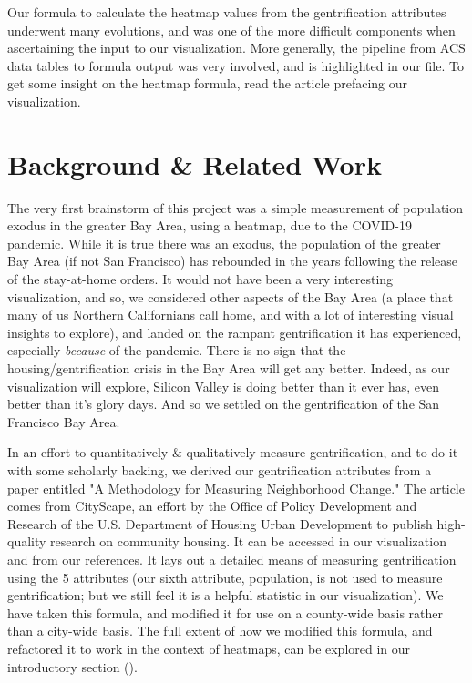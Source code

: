 \documentclass{article}
\begin{document}
    Our formula to calculate the heatmap values from the gentrification attributes underwent many evolutions, and was one of the more difficult components when ascertaining the input to our visualization. More generally, the pipeline from ACS data tables to formula output was very involved, and is highlighted in our  file. To get some insight on the heatmap formula, read the article prefacing our visualization. 

\section{Background \& Related Work}

    The very first brainstorm of this project was a simple measurement of population exodus in the greater Bay Area, using a heatmap, due to the COVID-19 pandemic. While it is true there was an exodus, the population of the greater Bay Area (if not San Francisco) has rebounded in the years following the release of the stay-at-home orders. It would not have been a very interesting visualization, and so, we considered other aspects of the Bay Area (a place that many of us Northern Californians call home, and with a lot of interesting visual insights to explore), and landed on the rampant gentrification it has experienced, especially \textit{because} of the pandemic. There is no sign that the housing/gentrification crisis in the Bay Area will get any better. Indeed, as our visualization will explore, Silicon Valley is doing better than it ever has, even better than it's glory days. And so we settled on the gentrification of the San Francisco Bay Area.

    In an effort to quantitatively \& qualitatively measure gentrification, and to do it with some scholarly backing, we derived our gentrification attributes from a paper entitled "A Methodology for Measuring Neighborhood Change." The article comes from CityScape, an effort by the Office of Policy Development and Research of the U.S. Department of Housing Urban Development to publish high-quality research on community housing. It can be accessed in our visualization and from our references. It lays out a detailed means of measuring gentrification using the 5 attributes (our sixth attribute, population, is not used to measure gentrification; but we still feel it is a helpful statistic in our visualization). We have taken this formula, and modified it for use on a county-wide basis rather than a city-wide basis. The full extent of how we modified this formula, and refactored it to work in the context of heatmaps, can be explored in our introductory section ().
    
\end{document}
